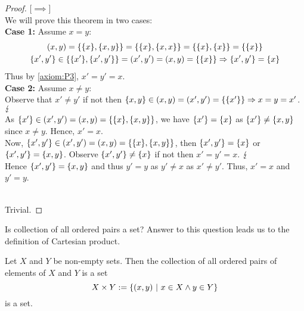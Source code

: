 \begin{proof}

	[\(\implies\)]\\
	We will prove this theorem in two cases:\\
	\textsf{\textbf{Case 1:}} Assume \(x = y\):
	\begin{gather*}
		(x, y) = \qty{\qty{x}, \qty{x, y}} = \qty{\qty{x}, \qty{x, x}} = \qty{\qty{x}, \qty{x}} = \qty{\qty{x}} \\
		\qty{x', y'} \in \qty{\qty{x'}, \qty{x', y'}} = (x', y') = (x, y) = \qty{\qty{x}} \Rightarrow \qty{x', y'} = \qty{x}
	\end{gather*}
	Thus by \cref{axiom:P3}, \(x' = y' = x\).\\
	\textsf{\textbf{Case 2:}} Assume \(x \neq y\):\\
	Observe that \(x' \ne y'\) if not then \(\qty{x, y} \in (x, y) = (x', y') = \qty{\qty{x'}} \Rightarrow x = y = x'\). \(\operatorname{\lightning}\) \\
	As \(\qty{x'} \in (x', y') = (x, y)  = \qty{\qty{x}, \qty{x, y}}\), we have \(\qty{x'} = \qty{x}\) as \(\qty{x'} \ne \qty{x, y}\) since \(x \ne y\). Hence, \(x' = x\). \\
	Now, \(\qty{x', y'} \in (x', y') = (x, y) = \qty{\qty{x}, \qty{x, y}}\), then \(\qty{x', y'} = \qty{x}\) or \(\qty{x', y'} = \qty{x, y}\). Observe \(\qty{x', y'} \ne \qty{x}\) if not then \(x' = y' = x\). \(\operatorname{\lightning}\) \\
	Hence \(\qty{x', y'} = \qty{x, y}\) and thus \(y' = y\) as \(y' \ne x\) as \(x' \ne y'\). Thus, \(x' = x\) and \(y' = y\).

	\noindent[\(\impliedby\)]\\
	Trivial.
\end{proof}
Is collection of all ordered pairs a set? Answer to this question leads us to the definition of Cartesian product.
\begin{theorem}
	Let \(X\) and \(Y\) be non-empty sets. Then the collection of all ordered pairs of elements of \(X\) and \(Y\) is a set \ie
	\begin{equation}
		X \times Y := \qty{(x, y) \ \middle|\ x \in X \land y \in Y}
	\end{equation}
	is a set.
\end{theorem}
